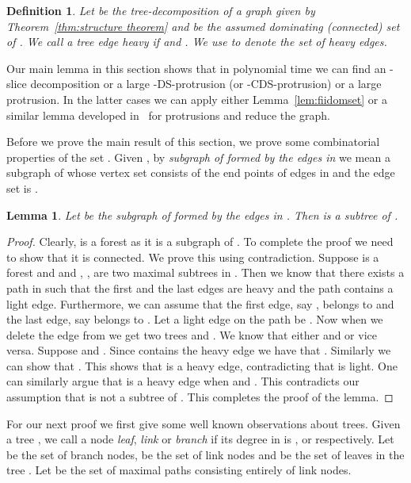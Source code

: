 \documentclass[11pt]{article}
\newtheorem{lemma}{Lemma}
\newtheorem{definition}{Definition}
\begin{document}
\begin{definition}
Let  be the tree-decomposition of a graph  given by  Theorem~\ref{thm:structure theorem} and  be the assumed dominating (connected) set of .  We call a tree edge  
{\em heavy} if  and . We use  to denote the set of heavy edges.  
\end{definition}







Our main lemma in this section shows that in polynomial time we can find an -slice decomposition or 
a large -{\sc DS}-protrusion (or -{\sc CDS}-protrusion) or a large protrusion. In the latter cases we can apply either 
Lemma~\ref{lem:fiidomset} or a similar lemma developed in~\cite[Lemma~7]{H.Bodlaender:2009ng} for protrusions and reduce the graph.  






Before we prove the main result of this section, we prove some combinatorial properties of the set .  Given , by {\em subgraph of  formed by the edges in } we mean a subgraph of  whose vertex set consists of the end points of edges in  and the edge set is . 

\begin{lemma}
Let  be the subgraph of  formed by the edges in . Then  is a subtree of .
\end{lemma}
\begin{proof}
Clearly,  is a forest as it is a subgraph of .  To complete the proof we need to show that it is connected. We prove 
this using contradiction.  Suppose  is a forest and   and , , are two maximal subtrees in . Then we know that there exists a path  in  
such that the first and the last edges are heavy and the path  contains a light edge. 
Furthermore, we can assume that the first edge, say
, belongs to  and the last edge, say   belongs to . Let a light edge on the path be . Now when we delete the 
edge  from  we get two trees  and . We know that either  and  or vice versa. 
Suppose  and . Since  contains the heavy edge  we have that 
. Similarly we can show that . This shows that  is a heavy edge, contradicting that  is light. One can similarly argue that  is a heavy edge  when   and . This contradicts our assumption that  is not a subtree of . This completes the proof of the lemma.
\end{proof}



For our next proof we first give some well known observations about trees. Given a tree , 
we call a node {\em leaf}, {\em link} or {\em branch} if its degree 
in  is ,  or  respectively. Let
 be the set of branch nodes, 
be the set of link nodes and  be the set of leaves in the
tree . Let  be the set of maximal paths
consisting entirely of link nodes.
\end{document}
